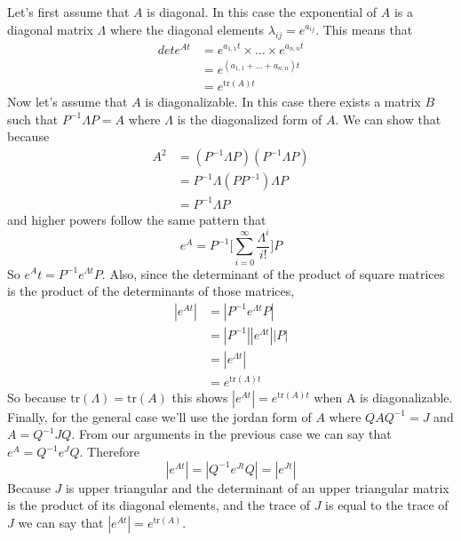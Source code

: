 \documentclass[11pt]{article}
\begin{document}
\subparagraph*{}
Let's first assume that $A$ is diagonal. In this case the exponential of $A$ is a diagonal matrix $\Lambda$ where the diagonal elements $\lambda_{ij} = e^{a_{ij}}$. This means that
\begin{align*}
	det{e^{At}} &= e^{a_{1,1}t} \times \dots \times e^{a_{n,n}t} \\
	&= e^{(a_{1,1} + \dots + a_{n,n})t} \\
	&= e^{\text{tr}(A)t}
\end{align*}
Now let's assume that $A$ is diagonalizable. In this case there exists a matrix $B$ such that $P^{-1}\Lambda P = A$ where $\Lambda$ is the diagonalized form of $A$. We can show that because
\begin{align*}
	A^2 &= (P^{-1}\Lambda P)(P^{-1}\Lambda P) \\
	&= P^{-1}\Lambda (PP^{-1}) \Lambda P \\
	&= P^{-1} \Lambda P
\end{align*}
and higher powers follow the same pattern that
\begin{equation*}
	e^A = P^{-1}\Bigg[\sum_{i=0}^\infty \frac{\Lambda^i}{i!} \Bigg] P
\end{equation*}
So $e^At = P^{-1}e^{\Lambda t} P$. Also, since the determinant of the product of square matrices is the product of the determinants of those matrices,
\begin{align*}
	|e^{At}| &= |P^{-1}e^{\Lambda t}P| \\
	&= |P^{-1}||e^{\Lambda t}||P| \\
	&= |e^{\Lambda t}| \\
	&= e^{\text{tr}(\Lambda) t}
\end{align*}
So because $\text{tr}(\Lambda)=\text{tr}(A)$ this shows $|e^{At}|=e^{\text{tr}(A)t}$ when A is diagonalizable. Finally, for the general case we'll use the jordan form of $A$ where $QAQ^{-1}=J$ and $A=Q^{-1}JQ$. From our arguments in the previous case we can say that $e^A=Q^{-1}e^JQ$. Therefore
\begin{equation*}
	|e^{At}| = |Q^{-1}e^{Jt}Q|=|e^{Jt}|
\end{equation*}
Because $J$ is upper triangular and the determinant of an upper triangular matrix is the product of its diagonal elements, and the trace of $J$ is equal to the trace of $J$ we can say that $|e^{At}| = e^{\text{tr}(A)}$.
\end{document}
